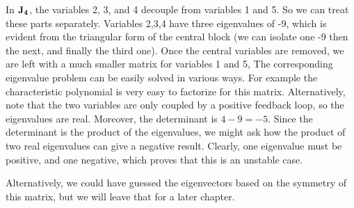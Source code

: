 In $\bf J_4$, the variables 2, 3, and 4 decouple from variables 1 and 5. So we can treat these parts separately. Variables 2,3,4 have three eigenvalues of -9, which is evident from the triangular form of the central block (we can isolate one -9 then the next, and finally the third one). Once the central variables are removed, we are left with a much smaller matrix for variables 1 and 5, 
The corresponding eigenvalue problem can be easily solved in various ways. For example the characteristic polynomial is very easy to factorize for this matrix. Alternatively, note that the two variables are only coupled by a positive feedback loop, so the eigenvalues are real. Moreover, the determinant is $4-9=-5$. Since the determinant is the product of the eigenvalues, we might ask how the product of two real eigenvalues can give a  negative result. Clearly, one eigenvalue must be positive, and one negative, which proves that this is an unstable case. 

Alternatively, we could have guessed the eigenvectors based on the symmetry of this matrix, but we will leave that for a later chapter.
